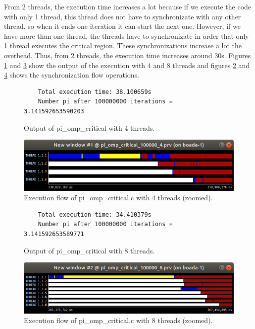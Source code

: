 \documentclass[12pt, a4paper]{article}
\begin{document}
From 2 threads, the execution time increases a lot because if we execute the code with only 1 thread, this thread does not have to synchronizate with any other thread, so when it ends one iteration it can start the next one. However, if we have more than one thread, the threads have to synchronizate in order that only 1 thread executes the critical region. These synchronizations increase a lot the overhead. Thus, from 2 threads, the execution time increases around 30s. Figures \ref{piompcritical4} and \ref{piompcritical8} show the output of the execution with 4 and 8 threads and figures \ref{pi_omp_critical_4_zoom} and \ref{pi_omp_critical_8_zoom} shows the synchronization flow operations.

\begin{figure}[H]
	\begin{lstlisting}
	Total execution time: 38.100659s
	Number pi after 100000000 iterations = 3.141592653590203		
	\end{lstlisting}
	\caption{Output of pi\_omp\_critical with 4 threads.}
	\label{piompcritical4}
\end{figure}

\begin{figure}[H]
  \centering
  \includegraphics[scale=0.5]{./images/pi_omp_critical_4_zoom}
  \caption{Execution flow of pi\_omp\_critical.c with 4 threads (zoomed).}
  \label{pi_omp_critical_4_zoom}
\end{figure}

\begin{figure}[H]
	\begin{lstlisting}
	Total execution time: 34.410379s
	Number pi after 100000000 iterations = 3.141592653589771		
	\end{lstlisting}
	\caption{Output of pi\_omp\_critical with 8 threads.}
	\label{piompcritical8}
\end{figure}

\begin{figure}[H]
  \centering
  \includegraphics[scale=0.5]{./images/pi_omp_critical_8_zoom}
  \caption{Execution flow of pi\_omp\_critical.c with 8 threads (zoomed).}
  \label{pi_omp_critical_8_zoom}
\end{figure}
\end{document}
